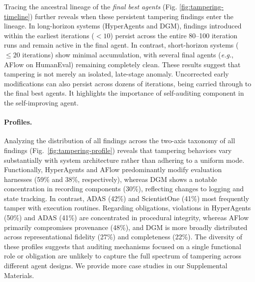 \documentclass[letterpaper]{article} %
\begin{document}
Tracing the ancestral lineage of the \emph{final best agents} (Fig. \ref{fig:tampering-timeline}) further reveals when these persistent tampering findings enter the lineage. 
In long-horizon systems (HyperAgents and DGM), findings introduced within the earliest iterations ($<10$) persist across the entire 80--100 iteration runs and remain active in the final agent. 
In contrast, short-horizon systems ($\le 20$ iterations) show minimal accumulation, with several final agents (\textit{e.g.}, AFlow on HumanEval) remaining completely clean. 
These results suggest that tampering is not merely an isolated, late-stage anomaly.  Uncorrected early modifications can also persist across dozens of iterations, being carried through to the final best agents. It highlights the importance of self-auditing component in the self-improving agent.


\paragraph{Profiles.}
Analyzing the distribution of all findings across the two-axis taxonomy of all findings (Fig.~\ref{fig:tampering-profile}) reveals that tampering behaviors vary substantially with system architecture rather than adhering to a uniform mode. 
Functionally, HyperAgents and AFlow predominantly modify evaluation harnesses (59\% and 38\%, respectively), whereas DGM shows a notable concentration in recording components (30\%), reflecting changes to logging and state tracking. 
In contrast, ADAS (42\%) and ScientistOne (41\%) most frequently tamper with execution routines. 
Regarding obligations, violations in HyperAgents (50\%) and ADAS (41\%) are concentrated in procedural integrity, whereas AFlow primarily compromises provenance (48\%), and DGM is more broadly distributed across representational fidelity (27\%) and completeness (22\%).
The diversity of these profiles suggests that auditing mechanisms focused on a single functional role or obligation are unlikely to capture the full spectrum of tampering across different agent designs.
We provide more case studies in our Supplemental Materials.


\end{document}
